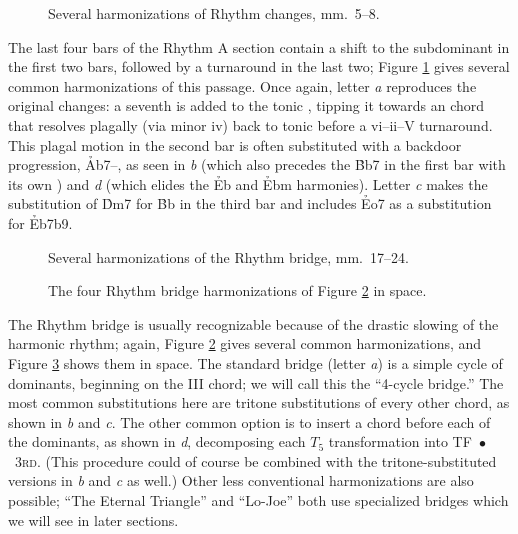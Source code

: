 \begin{figure}[tbp]
  \caption{Several harmonizations of Rhythm changes, mm.~5--8.}
  \label{rcg:rc-next-four}
\end{figure}

The last four bars of the Rhythm A section contain a shift to the subdominant
in the first two bars, followed by a turnaround in the last two; Figure
\ref{rcg:rc-next-four} gives several common harmonizations of this passage.
Once again, letter \emph{a} reproduces the original changes: a seventh is
added to the tonic \Bflat, tipping it towards an \Eflat chord that resolves
plagally (via minor iv) back to tonic before a vi--ii--V turnaround. This
plagal motion in the second bar is often substituted with a backdoor
progression, \h{Ab7}--\Bflat, as seen in \emph{b} (which also precedes the
\h{Bb7} in the first bar with its own \ii) and \emph{d} (which elides the
\h{Eb} and \h{Ebm} harmonies). Letter \emph{c} makes the substitution of
\h{Dm7} for \h{Bb} in the third bar and includes \h{Eo7} as a substitution for
\h{Eb7b9}.

\begin{figure}[tbp]
  \caption{Several harmonizations of the Rhythm bridge, mm.~17--24.}
  \label{rcg:rc-bridge}
\end{figure}

\begin{figure}[tbp]
  \caption{The four Rhythm bridge harmonizations of Figure \ref{rcg:rc-bridge}
    in \tf space.}
  \label{rcg:rc-bridge-space}
\end{figure}

The Rhythm bridge is usually recognizable because of the drastic slowing of
the harmonic rhythm; again, Figure \ref{rcg:rc-bridge} gives several common
harmonizations, and Figure \ref{rcg:rc-bridge-space} shows them in \tf space.
The standard bridge (letter \emph{a}) is a simple cycle of dominants,
beginning on the III chord; we will call this the ``4-cycle bridge.'' The most
common substitutions here are tritone substitutions of every other chord, as
shown in \emph{b} and \emph{c}. The other common option is to insert a \ii chord
before each of the dominants, as shown in \emph{d}, decomposing each $T_5$
transformation into \mbox{TF $\bullet$ \textsc{3rd}}. (This procedure could of course
be combined with the tritone-substituted versions in \emph{b} and \emph{c} as
well.) Other less conventional harmonizations are also possible; ``The Eternal
Triangle'' and ``Lo-Joe'' both use specialized bridges which we will see
in later sections.

